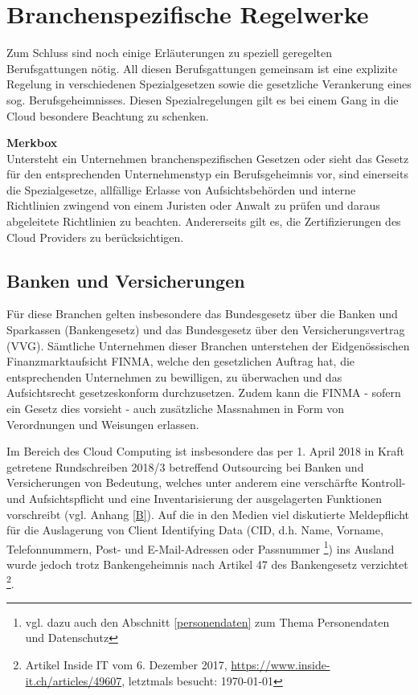 \documentclass[a4paper,pointlessnumbers]{scrreprt}
\newcommand{\merkbox}[2][0.8\textwidth]{ \begin{center} \begin{tcolorbox}[enhanced, drop fuzzy midday shadow, width={#1}, opacityframe=0.5, colframe=BrickRed, colback=white] {\ECFTeenSpirit \color{BrickRed}\textbf{Merkbox} \qquad {\tiny das gilt es zu beachten}} \\  #2 \end{tcolorbox} \end{center}}
\begin{document}
\pagebreak

\section{Branchenspezifische Regelwerke}
Zum Schluss sind noch einige Erläuterungen zu speziell geregelten Berufsgattungen nötig. All diesen Berufsgattungen gemeinsam ist eine explizite Regelung in verschiedenen Spezialgesetzen sowie die gesetzliche Verankerung eines sog. Berufsgeheimnisses. Diesen Spezialregelungen gilt es bei einem Gang in die Cloud besondere Beachtung zu schenken.

\merkbox[0.7\textwidth]{Untersteht ein Unternehmen branchenspezifischen Gesetzen oder sieht das Gesetz für den entsprechenden Unternehmenstyp ein Berufsgeheimnis vor, sind einerseits die Spezialgesetze, allfällige Erlasse von Aufsichtsbehörden und interne Richtlinien zwingend von einem Juristen oder Anwalt zu prüfen und daraus abgeleitete Richtlinien zu beachten. Andererseits gilt es, die Zertifizierungen des Cloud Providers zu berücksichtigen.}

\subsection{Banken und Versicherungen}
Für diese Branchen gelten insbesondere das Bundesgesetz über die Banken und Sparkassen (Bankengesetz) und das Bundesgesetz über den Versicherungsvertrag (VVG). Sämtliche Unternehmen dieser Branchen unterstehen der Eidgenössischen Finanzmarktaufsicht FINMA, welche den gesetzlichen Auftrag hat, die entsprechenden Unternehmen zu bewilligen, zu überwachen und das Aufsichtsrecht gesetzeskonform durchzusetzen. Zudem kann die FINMA - sofern ein Gesetz dies vorsieht - auch zusätzliche Massnahmen in Form von Verordnungen und Weisungen erlassen.

Im Bereich des Cloud Computing ist insbesondere das per 1. April 2018 in Kraft getretene Rundschreiben 2018/3 betreffend Outsourcing bei Banken und Versicherungen von Bedeutung, welches unter anderem eine verschärfte Kontroll- und Aufsichtspflicht und eine Inventarisierung der ausgelagerten Funktionen vorschreibt (vgl. Anhang \ref{B}). Auf die in den Medien viel diskutierte Meldepflicht für die Auslagerung von Client Identifying Data (CID, d.h. Name, Vorname, Telefonnummern, Post- und E-Mail-Adressen oder Passnummer \footnote{vgl. dazu auch den Abschnitt \ref{personendaten} zum Thema Personendaten und Datenschutz}) ins Ausland wurde jedoch trotz Bankengeheimnis nach Artikel 47 des Bankengesetz verzichtet \footnote{Artikel Inside IT vom 6. Dezember 2017, \href{https://www.inside-it.ch/articles/49607}{https://www.inside-it.ch/articles/49607}, letztmals besucht: \today}.
\end{document}
